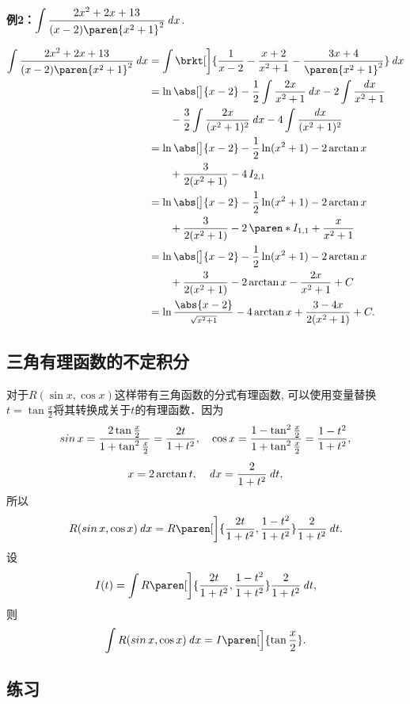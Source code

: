 \documentclass[a4paper,punct=CCT]{ctexbook}
\newcommand*{\ex}[2]{\textbf{例#1：}#2}
\newcommand*{\disp}[1]{\( \displaystyle #1 \)}
\newcommand*{\exds}[2]{\ex{#1}\disp{#2}}
\theoremstyle{definition}
\theoremstyle{remark}
\newif\ifshowex
\begin{document}
\exds{2}{\int \frac{2x^2 + 2x + 13}{(x-2)\paren{x^2+1}^2} \dx}.

\begin{align*}
  \int \frac{2x^2 + 2x + 13}{(x-2)\paren{x^2+1}^2} \dx
  &= \int \brkt[\bigg]{\frac{1}{x-2} - \frac{x+2}{x^2+1} - \frac{3x+4}{\paren{x^2+1}^2}} \dx \\
  &= \ln\abs[\big]{x-2}
    - \frac12 \int \frac{2x}{x^2+1} \dx
    - 2 \int \frac{\dx}{x^2+1} \\
  &\qquad - \frac32 \int \frac{2x}{(x^2+1)^2} \dx - 4 \int \frac{\dx}{(x^2+1)^2} \\
  &= \ln\abs[\big]{x-2} - \frac12 \ln(x^2+1) - 2 \arctan x \\
  &\qquad + \frac{3}{2(x^2+1)} - 4 \, I_{2,1} \\
  &= \ln\abs[\big]{x-2} - \frac12 \ln(x^2+1) - 2 \arctan x \\
  &\qquad + \frac{3}{2(x^2+1)} - 2 \, \paren*{I_{1,1} + \frac{x}{x^2+1}} \\
  &= \ln\abs[\big]{x-2} - \frac12 \ln(x^2+1) - 2 \arctan x \\
  &\qquad + \frac{3}{2(x^2+1)} - 2 \arctan x  - \frac{2x}{x^2+1} + C \\
  &= \ln\frac{\abs{x-2}}{\scriptstyle\sqrt{x^2+1}} - 4 \arctan x + \frac{3-4x}{2(x^2+1)} + C.
\end{align*}

\subsection{三角有理函数的不定积分}

对于\(R(\sin x, \cos x)\)这样带有三角函数的分式有理函数, 可以使用变量替换\(t = \tan\frac{x}{2}\)将其转换成关于\(t\)的有理函数．因为
\begin{gather*}
  \operatorname{\smash{sin}} x = \frac{2\tan\frac{x}{2}}{1+\tan^2\frac{x}{2}} = \frac{2t}{1+t^2},
  \quad
  \cos x = \frac{1 - \tan^2\frac{x}{2}}{1+\tan^2\frac{x}{2}} = \frac{1-t^2}{1+t^2}, \\[1ex]
  x = 2 \arctan t,
  \quad
  \mathop{}\!\mathit{d} x = \frac{2}{1+t^2} \mathop{}\!\mathit{d} t,
\end{gather*}
所以
\[
  R(\sin x, \cos x) \dx = R\paren[\bigg]{\frac{2t}{1+t^2}, \frac{1-t^2}{1+t^2}} \frac{2}{1+t^2} \dt.
\]
设
\[
  I(t) = \int R\paren[\bigg]{\frac{2t}{1+t^2}, \frac{1-t^2}{1+t^2}} \frac{2}{1+t^2} \dt,
\]
则
\[
  \int R(\sin x, \cos x) \dx = I\paren[\Big]{\tan\frac{x}{2}}.
\]

\ifshowex
{}
\subsection*{练习}
\end{document}
